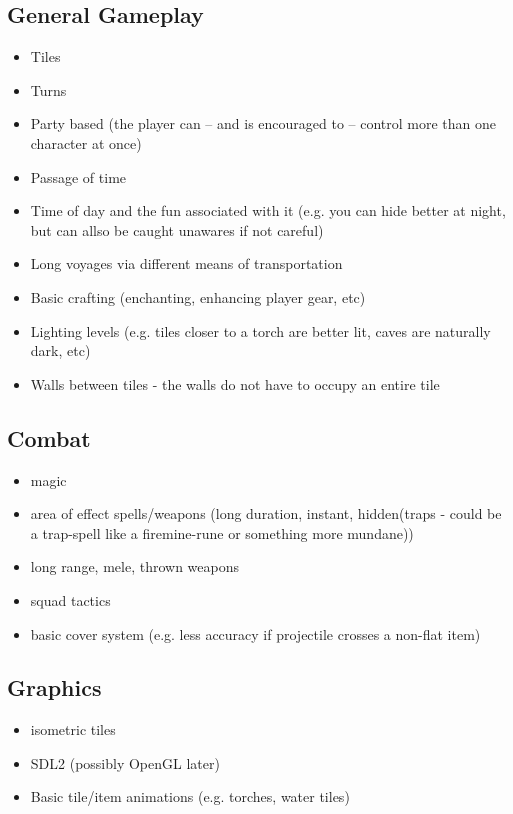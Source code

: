 \documentclass[a4paper,10pt]{book}
\begin{document}
\subsection{General Gameplay}
\begin{itemize}
  \item Tiles
  \item Turns
  \item Party based (the player can -- and is encouraged to -- control more
    than one character at once)
  \item Passage of time
  \item Time of day and the fun associated with it (e.g. you can hide better at
    night, but can allso be caught unawares if not careful)
  \item Long voyages via different means of transportation
  \item Basic crafting (enchanting, enhancing player gear, etc)
  \item Lighting levels (e.g. tiles closer to a torch are better lit, caves
    are naturally dark, etc)
  \item Walls between tiles - the walls do not have to occupy an entire tile
\end{itemize}

\subsection{Combat}
\begin{itemize}
  \item magic
  \item area of effect spells/weapons (long duration, instant, hidden(traps -
    could be a trap-spell like a firemine-rune or something more mundane))
  \item long range, mele, thrown weapons
  \item squad tactics
  \item basic cover system (e.g. less accuracy if projectile crosses a non-flat
    item)
\end{itemize}

\subsection{Graphics}
\begin{itemize}
  \item isometric tiles
  \item SDL2 (possibly OpenGL later)
  \item Basic tile/item animations (e.g. torches, water tiles)
\end{itemize}
\end{document}
